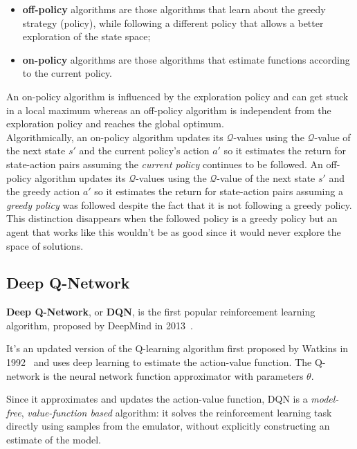 \begin{itemize}
    \item \textbf{off-policy} algorithms are those algorithms that learn about the greedy strategy (policy), while following a different policy that allows a better exploration of the state space;
    \item \textbf{on-policy} algorithms are those algorithms that estimate functions according to the current policy.
\end{itemize}

An on-policy algorithm is influenced by the exploration policy and can get stuck in a local maximum whereas an off-policy algorithm is independent from the exploration policy and reaches the global optimum. \\
Algorithmically, an on-policy algorithm updates its $\mathcal{Q}$-values using the $\mathcal{Q}$-value of the next state $s'$ and the current policy's action $a'$ so it estimates the return for state-action pairs assuming the \textit{current policy} continues to be followed. An off-policy algorithm updates its $\mathcal{Q}$-values using the $\mathcal{Q}$-value of the next state $s'$ and the greedy action $a'$ so it estimates the return for state-action pairs assuming a \textit{greedy policy} was followed despite the fact that it is not following a greedy policy. \\
This distinction disappears when the followed policy is a greedy policy but an agent that works like this wouldn't be as good since it would never explore the space of solutions.



\subsection{Deep Q-Network}

\textbf{Deep Q-Network}, or \textbf{DQN}, is the first popular reinforcement learning algorithm, proposed by DeepMind in 2013~\cite{pongpixels}.

It's an updated version of the Q-learning algorithm first proposed by Watkins in 1992~\cite{Watkins1992} and uses deep learning to estimate the action-value function. The Q-network is the neural network function approximator with parameters $\theta$.

Since it approximates and updates the action-value function, DQN is a \textit{model-free}, \textit{value-function based} algorithm: it solves the reinforcement learning task directly using samples from the emulator, without explicitly constructing an estimate of the model.

